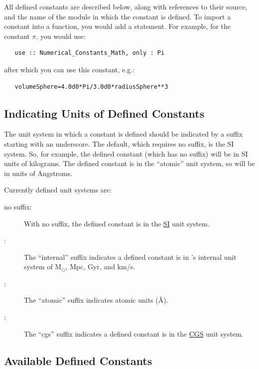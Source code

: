 All defined constants are described below, along with references to their source, and the name of the module in which the constant is defined. To import a constant into a function, you would add a  statement. For example, for the constant $\pi$, you would use:
\begin{verbatim}
   use :: Numerical_Constants_Math, only : Pi
\end{verbatim}
after which you can use this constant, e.g.:
\begin{verbatim}
   volumeSphere=4.0d0*Pi/3.0d0*radiusSphere**3
\end{verbatim}

\subsection{Indicating Units of Defined Constants}

The unit system in which a constant is defined should be indicated by a suffix starting with an underscore. The default, which requires no suffix, is the SI system. So, for example, the defined constant  (which has no suffix) will be in SI units of kilograms. The defined constant  is in the ``atomic'' unit system, so will be in units of Angstroms.

Currently defined unit systems are:
\begin{description}
\item[no suffix:] With no suffix, the defined constant is in the \href{https://en.wikipedia.org/wiki/International_System_of_Units}{SI} unit system.
\item[:] The ``internal'' suffix indicates a defined constant is in \glc's internal unit system of $\mathrm{M}_\odot$, Mpc, Gyr, and km/s.
\item[:] The ``atomic'' suffix indicates atomic units (\AA).
\item[:] The ``cgs'' suffix indicates a defined constant is in the \href{https://en.wikipedia.org/wiki/Centimetre%E2%80%93gram%E2%80%93second_system_of_units}{CGS} unit system.
\end{description}

\subsection{Available Defined Constants}\label{sec:definedConstants}



